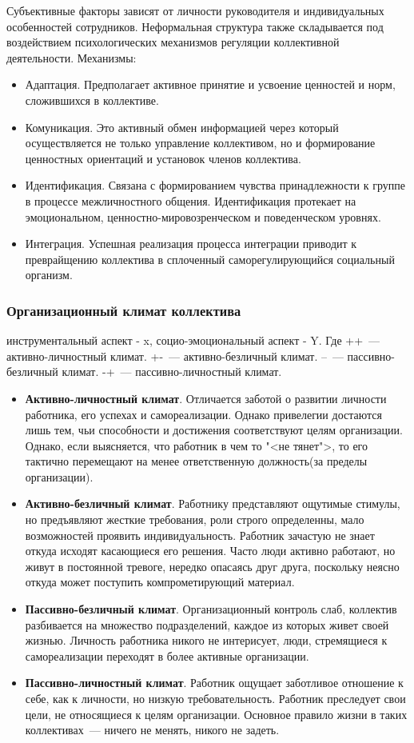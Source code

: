Субъективные факторы зависят от личности руководителя и индивидуальных особенностей сотрудников. Неформальная структура также складывается под воздействием психологических механизмов регуляции коллективной деятельности. Механизмы:
\begin{itemize}
	\item Адаптация. Предполагает активное принятие и усвоение ценностей и норм, сложившихся в коллективе.
	\item Комуникация. Это активный обмен информацией через который осуществляется не только управление коллективом, но и формирование ценностных ориентаций и установок членов коллектива.
	\item Идентификация. Связана с формированием чувства принадлежности к группе в процессе межличностного общения. Идентификация протекает на эмоциональном, ценностно-мировозренческом и поведенческом уровнях.
	\item Интеграция. Успешная реализация процесса интеграции приводит к преврайщению коллектива в сплоченный саморегулирующийся социальный организм.
\end{itemize}

\subsubsection{Организационный климат коллектива}
инструментальный аспект - x, социо-эмоциональный аспект - Y. Где ++~--- активно-личностный климат. +-~--- активно-безличный климат. --~--- пассивно-безличный климат. -+~--- пассивно-личностный климат.
\begin{itemize}
	\item \textbf{Активно-личностный климат}. Отличается заботой о развитии личности работника, его успехах и самореализации. Однако привелегии достаются лишь тем, чьи способности и достижения соответствуют целям организации. Однако, если выясняется, что работник в чем то "<не тянет">, то его тактично перемещают на менее ответственную должность(за пределы организации).
	\item \textbf{Активно-безличный климат}. Работнику представляют ощутимые стимулы, но предъявляют жесткие требования, роли строго определенны, мало возможностей проявить индивидуальность. Работник зачастую не знает откуда исходят касающиеся его решения. Часто люди активно работают, но живут в постоянной тревоге, нередко опасаясь друг друга, поскольку неясно откуда может поступить компрометирующий материал.
	\item \textbf{Пассивно-безличный климат}. Организационный контроль слаб, коллектив разбивается на множество подразделений, каждое из которых живет своей жизнью. Личность работника никого не интерисует, люди, стремящиеся к самореализации переходят в более активные организации.
	\item \textbf{Пассивно-личностный климат}. Работник ощущает заботливое отношение к себе, как к личности, но низкую требовательность. Работник преследует свои цели, не относящиеся к целям организации. Основное правило жизни в таких коллективах~--- ничего не менять, никого не задеть.
\end{itemize}
